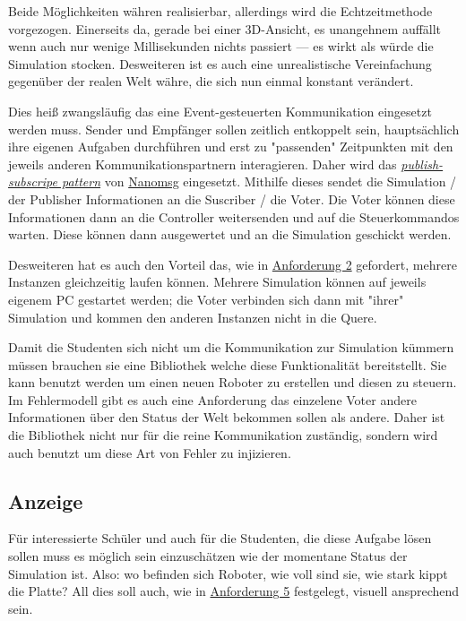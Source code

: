 Beide M{\"{o}}glichkeiten w{\"{a}}hren realisierbar, allerdings wird die Echtzeitmethode vorgezogen. Einerseits da, gerade bei einer
3D-Ansicht, es unangehnem auff{\"{a}}llt wenn auch nur wenige Millisekunden nichts passiert --- es wirkt als w{\"{u}}rde die
Simulation stocken. Desweiteren ist es auch eine unrealistische Vereinfachung gegen{\"{u}}ber der realen Welt w{\"{a}}hre,
die sich nun einmal konstant ver{\"{a}}ndert.

Dies hei{\ss} zwangsl{\"{a}}ufig das eine Event-gesteuerten Kommunikation eingesetzt werden muss. Sender und Empf{\"{a}}nger
sollen zeitlich entkoppelt sein, haupts{\"{a}}chlich ihre eigenen Aufgaben durchf{\"{u}}hren und erst zu "passenden" Zeitpunkten
mit den jeweils anderen Kommunikationspartnern interagieren. Daher wird das \hyperref[pubsub]{\textit{publish-subscripe pattern}}
von \hyperref[nanomsg]{Nanomsg} eingesetzt. Mithilfe dieses sendet die Simulation / der Publisher
Informationen an die Suscriber / die Voter. Die Voter k{\"{o}}nnen diese Informationen dann an die Controller weitersenden und auf die
Steuerkommandos warten. Diese k{\"{o}}nnen dann ausgewertet und an die Simulation geschickt werden.

Desweiteren hat es auch den Vorteil das, wie in \hyperref[Anforderung]{Anforderung 2} gefordert, mehrere Instanzen gleichzeitig
laufen k{\"{o}}nnen. Mehrere Simulation k{\"{o}}nnen auf jeweils eigenem PC gestartet werden; die Voter verbinden sich dann mit "ihrer"
Simulation und kommen den anderen Instanzen nicht in die Quere.

Damit die Studenten sich nicht um die Kommunikation zur Simulation k{\"{u}}mmern m{\"{u}}ssen brauchen sie eine Bibliothek welche
diese Funktionalit{\"{a}}t bereitstellt. Sie kann benutzt werden um einen neuen Roboter zu erstellen und diesen zu steuern.
Im Fehlermodell gibt es auch eine Anforderung das einzelene Voter andere Informationen {\"{u}}ber den Status der Welt
bekommen sollen als andere. Daher ist die Bibliothek nicht nur f{\"{u}}r die reine Kommunikation zust{\"{a}}ndig, sondern wird auch
benutzt um diese Art von Fehler zu injizieren.

\subsection{Anzeige}\label{graphics}
F{\"{u}}r interessierte Sch{\"{u}}ler und auch f{\"{u}}r die Studenten, die diese Aufgabe l{\"{o}}sen
sollen muss es m{\"{o}}glich sein einzusch{\"{a}}tzen wie der momentane Status der Simulation ist.
Also: wo befinden sich Roboter, wie voll sind sie, wie stark kippt die Platte? All dies soll auch, wie
in \hyperref[anforderung]{Anforderung 5} festgelegt, visuell ansprechend sein.

